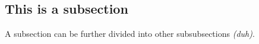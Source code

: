 \documentclass[../../main.tex]{subfiles}
\begin{document}
\subsection{This is a subsection}
A subsection can be further divided into other subsubsections \textit{(duh)}.
\end{document}
